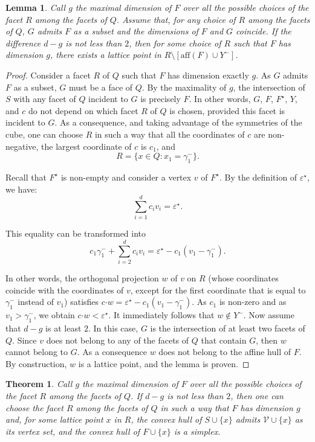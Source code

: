 \documentclass[a4paper]{article}
\newtheorem{theorem}{Theorem}
\newtheorem{lemma}{Lemma}
\begin{document}
\begin{lemma}\label{Lem.EA}
Call $g$ the maximal dimension of $F$ over all the possible choices of the facet $R$ among the facets of $Q$. Assume that, for any choice of $R$ among the facets of $Q$, $G$ admits $F$ as a subset and the dimensions of $F$ and $G$ coincide. If the difference $d-g$ is not less than $2$, then for some choice of $R$ such that $F$ has dimension $g$, there exists a lattice point in $R\mathord{\setminus}[\mathrm{aff}(F)\cup{Y^-}]$.
\end{lemma}
\begin{proof}
Consider a facet $R$ of $Q$ such that $F$ has dimension exactly $g$. As $G$ admits $F$ as a subset, $G$ must be a face of $Q$. By the maximality of $g$, the intersection of $S$ with any facet of $Q$ incident to $G$ is precisely $F$. In other words, $G$, $F$, $F^\star$, $Y$, and $c$ do not depend on which facet $R$ of $Q$ is chosen, provided this facet is incident to $G$. As a consequence, and taking advantage of the symmetries of the cube, one can choose $R$ in such a way that all the coordinates of $c$ are non-negative, the largest coordinate of $c$ is $c_1$, and
$$
R=\{x\in{Q}:x_1=\gamma_1^-\}\mbox{.}
$$

Recall that $F^\star$ is non-empty and consider a vertex $v$ of $F^\star$. By the definition of $\varepsilon^\star$, we have:
$$
\sum_{i=1}^dc_iv_i=\varepsilon^\star\mbox{.}
$$

This equality can be transformed into
$$
c_1\gamma_1^-+\sum_{i=2}^dc_iv_i=\varepsilon^\star-c_1(v_1-\gamma_1^-)\mbox{.}
$$

In other words, the orthogonal projection $w$ of $v$ on $R$ (whose coordinates coincide with the coordinates of $v$, except for the first coordinate that is equal to $\gamma_1^-$ instead of $v_1$) satisfies $c\mathord{\cdot}w=\varepsilon^\star-c_1(v_1-\gamma_1^-)$. As $c_1$ is non-zero and as $v_1>\gamma_1^-$, we obtain $c\mathord{\cdot}w<\varepsilon^\star$. It immediately follows that $w\not\in{Y^-}$. Now assume that $d-g$ is at least $2$. In this case, $G$ is the intersection of at least two facets of $Q$. Since $v$ does not belong to any of the facets of $Q$ that contain $G$, then $w$ cannot belong to $G$. As a consequence $w$ does not belong to the affine hull of $F$. By construction, $w$ is a lattice point, and the lemma is proven.
\end{proof}

\begin{theorem}\label{thm.add}
Call $g$ the maximal dimension of $F$ over all the possible choices of the facet $R$ among the facets of $Q$. If $d-g$ is not less than $2$, then one can choose the facet $R$ among the facets of $Q$ in such a way that $F$ has dimension $g$ and, for some lattice point $x$ in $R$, the convex hull of $S\cup\{x\}$ admits $\mathcal{V}\cup\{x\}$ as its vertex set, and the convex hull of $F\cup\{x\}$ is a simplex.
\end{theorem}
\end{document}
